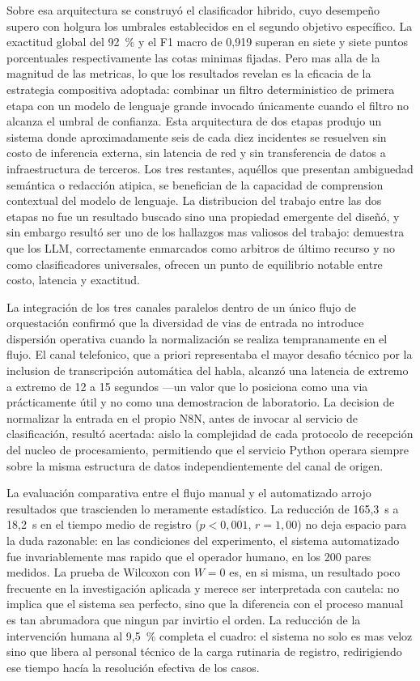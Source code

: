 Sobre esa arquitectura se construyó el clasificador hibrido, cuyo desempeño supero con holgura los umbrales establecidos en el segundo objetivo específico. La exactitud global del 92~\% y el F1 macro de 0,919 superan en siete y siete puntos porcentuales respectivamente las cotas minimas fijadas. Pero mas alla de la magnitud de las metricas, lo que los resultados revelan es la eficacia de la estrategia compositiva adoptada: combinar un filtro deterministico de primera etapa con un modelo de lenguaje grande invocado únicamente cuando el filtro no alcanza el umbral de confianza. Esta arquitectura de dos etapas produjo un sistema donde aproximadamente seis de cada diez incidentes se resuelven sin costo de inferencia externa, sin latencia de red y sin transferencia de datos a infraestructura de terceros. Los tres restantes, aquéllos que presentan ambiguedad semántica o redacción atipica, se benefician de la capacidad de comprension contextual del modelo de lenguaje. La distribucion del trabajo entre las dos etapas no fue un resultado buscado sino una propiedad emergente del diseñó, y sin embargo resultó ser uno de los hallazgos mas valiosos del trabajo: demuestra que los LLM, correctamente enmarcados como arbitros de último recurso y no como clasificadores universales, ofrecen un punto de equilibrio notable entre costo, latencia y exactitud.

La integración de los tres canales paralelos dentro de un único flujo de orquestación confirmó que la diversidad de vias de entrada no introduce dispersión operativa cuando la normalización se realiza tempranamente en el flujo. El canal telefonico, que a priori representaba el mayor desafio técnico por la inclusion de transcripción automática del habla, alcanzó una latencia de extremo a extremo de 12 a 15 segundos ---un valor que lo posiciona como una via prácticamente útil y no como una demostracion de laboratorio. La decision de normalizar la entrada en el propio N8N, antes de invocar al servicio de clasificación, resultó acertada: aislo la complejidad de cada protocolo de recepción del nucleo de procesamiento, permitiendo que el servicio Python operara siempre sobre la misma estructura de datos independientemente del canal de origen.

La evaluación comparativa entre el flujo manual y el automatizado arrojo resultados que trascienden lo meramente estadístico. La reducción de 165,3~s a 18,2~s en el tiempo medio de registro (\(p < 0{,}001\), \(r = 1{,}00\)) no deja espacio para la duda razonable: en las condiciones del experimento, el sistema automatizado fue invariablemente mas rapido que el operador humano, en los 200 pares medidos. La prueba de Wilcoxon con \(W = 0\) es, en si misma, un resultado poco frecuente en la investigación aplicada y merece ser interpretada con cautela: no implica que el sistema sea perfecto, sino que la diferencia con el proceso manual es tan abrumadora que ningun par invirtio el orden. La reducción de la intervención humana al 9,5~\% completa el cuadro: el sistema no solo es mas veloz sino que libera al personal técnico de la carga rutinaria de registro, redirigiendo ese tiempo hacía la resolución efectiva de los casos.

